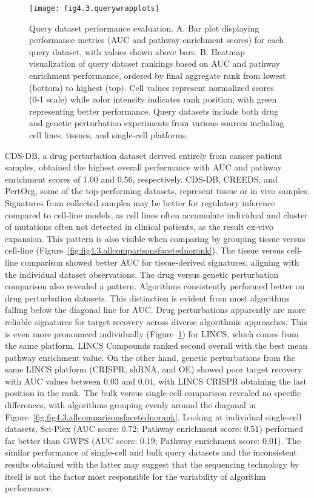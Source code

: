 \begin{figure}[htbp]
    \centering
    \texttt{[image: fig4.3.querywrapplots]}
    \caption[Query dataset performance evaluation.]{Query dataset performance evaluation. A. Bar plot displaying performance metrics (\gls{AUC} and pathway enrichment scores) for each query dataset, with values shown above bars. B. Heatmap visualization of query dataset rankings based on AUC and pathway enrichment performance, ordered by final aggregate rank from lowest (bottom) to highest (top). Cell values represent normalized scores (0-1 scale) while color intensity indicates rank position, with green representing better performance. Query datasets include both drug and genetic perturbation experiments from various sources including cell lines, tissues, and single-cell platforms.}
    \label{fig:fig4.3.querywrapplots}
\end{figure}

\gls{CDS-DB}, a drug perturbation dataset derived entirely from cancer patient samples, obtained the highest overall performance with \gls{AUC} and pathway enrichment scores of 1.00 and 0.56, respectively. CDS-DB, CREEDS, and PertOrg, some of the top-performing datasets, represent tissue or in vivo samples. Signatures from collected samples may be better for regulatory inference compared to cell-line models, as cell lines often accumulate individual and cluster of mutations often not detected in clinical patients, as the result ex-vivo expansion. This pattern is also visible when comparing by grouping tissue versus cell-line (Figure~\ref{fig:fig4.3.allcomparisonsfacetednorank}). The tissue versus cell-line comparison showed better \gls{AUC} for tissue-derived signatures, aligning with the individual dataset observations. The drug versus genetic perturbation comparison also revealed a pattern. Algorithms consistently performed better on drug perturbation datasets. This distinction is evident from most algorithms falling below the diagonal line for \gls{AUC}. Drug perturbations apparently are more reliable signatures for target recovery across diverse algorithmic approaches. This is even more pronounced individually (Figure~\ref{fig:fig4.3.querywrapplots}) for LINCS, which comes from the same platform. LINCS Compounds ranked second overall with the best mean pathway enrichment value. On the other hand, genetic perturbations from the same LINCS platform (\gls{CRISPR}, shRNA, and \gls{OE}) showed poor target recovery with \gls{AUC} values between 0.03 and 0.04, with LINCS CRISPR obtaining the last position in the rank. 
The bulk versus single-cell comparison revealed no specific differences, with algorithms grouping evenly around the diagonal in Figure~\ref{fig:fig4.3.allcomparisonsfacetednorank}. Looking at individual single-cell datasets, Sci-Plex (\gls{AUC} score: 0.72; Pathway enrichment score: 0.51) performed far better than GWPS (\gls{AUC} score: 0.19; Pathway enrichment score: 0.01). The similar performance of single-cell and bulk query datasets and the inconsistent results obtained with the latter may suggest that the sequencing technology by itself is not the factor most responsible for the variability of algorithm performance.


